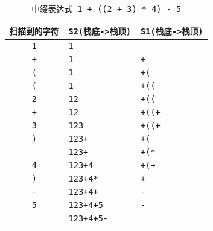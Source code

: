 \begin{frame}
\begin{scriptsize}
\begin{table}
\centering
\caption{{\tt 中缀表达式 1 + ((2 + 3) * 4) - 5}}
\begin{tabular}{|c|l|l|}\hline
{\tt 扫描到的字符} & {\tt S2(栈底->栈顶)} & {\tt S1(栈底->栈顶)} \\\hline
{\tt 1} &   {\tt 1} &         \\\hline 
{\tt +} &   {\tt 1} &  {\tt +}\\\hline 
{\tt (} &   {\tt 1} &  {\tt +(}\\\hline 
{\tt (} &   {\tt 1} &  {\tt +((}\\\hline 
{\tt 2} &   {\tt 12} &  {\tt +((}\\\hline 
{\tt +} &   {\tt 12} &  {\tt +((+}\\\hline 
{\tt 3} &   {\tt 123} &  {\tt +((+}\\\hline 
{\tt )} &   {\tt 123+} &  {\tt +(}\\\hline 
{\tt *} &   {\tt 123+} &  {\tt +(*}\\\hline 
{\tt 4} &   {\tt 123+4} &  {\tt +(+}\\\hline 
{\tt )} &   {\tt 123+4*} &  {\tt +}\\\hline 
{\tt -} &   {\tt 123+4+} &  {\tt -}\\\hline 
{\tt 5} &   {\tt 123+4+5} &  {\tt -}\\\hline 
        &   {\tt 123+4+5-} &  \\\hline 
\end{tabular}
\end{table}
\end{scriptsize}
\end{frame}




